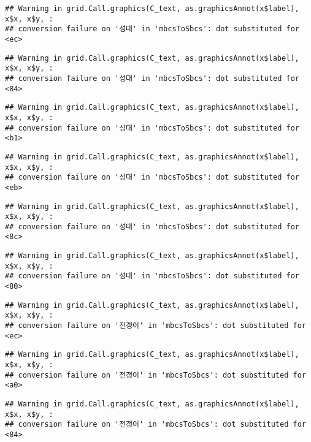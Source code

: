 \documentclass[
]{article}
\begin{document}
\begin{verbatim}
## Warning in grid.Call.graphics(C_text, as.graphicsAnnot(x$label), x$x, x$y, :
## conversion failure on '성대' in 'mbcsToSbcs': dot substituted for <ec>
\end{verbatim}

\begin{verbatim}
## Warning in grid.Call.graphics(C_text, as.graphicsAnnot(x$label), x$x, x$y, :
## conversion failure on '성대' in 'mbcsToSbcs': dot substituted for <84>
\end{verbatim}

\begin{verbatim}
## Warning in grid.Call.graphics(C_text, as.graphicsAnnot(x$label), x$x, x$y, :
## conversion failure on '성대' in 'mbcsToSbcs': dot substituted for <b1>
\end{verbatim}

\begin{verbatim}
## Warning in grid.Call.graphics(C_text, as.graphicsAnnot(x$label), x$x, x$y, :
## conversion failure on '성대' in 'mbcsToSbcs': dot substituted for <eb>
\end{verbatim}

\begin{verbatim}
## Warning in grid.Call.graphics(C_text, as.graphicsAnnot(x$label), x$x, x$y, :
## conversion failure on '성대' in 'mbcsToSbcs': dot substituted for <8c>
\end{verbatim}

\begin{verbatim}
## Warning in grid.Call.graphics(C_text, as.graphicsAnnot(x$label), x$x, x$y, :
## conversion failure on '성대' in 'mbcsToSbcs': dot substituted for <80>
\end{verbatim}

\begin{verbatim}
## Warning in grid.Call.graphics(C_text, as.graphicsAnnot(x$label), x$x, x$y, :
## conversion failure on '전갱이' in 'mbcsToSbcs': dot substituted for <ec>
\end{verbatim}

\begin{verbatim}
## Warning in grid.Call.graphics(C_text, as.graphicsAnnot(x$label), x$x, x$y, :
## conversion failure on '전갱이' in 'mbcsToSbcs': dot substituted for <a0>
\end{verbatim}

\begin{verbatim}
## Warning in grid.Call.graphics(C_text, as.graphicsAnnot(x$label), x$x, x$y, :
## conversion failure on '전갱이' in 'mbcsToSbcs': dot substituted for <84>
\end{verbatim}
\end{document}
